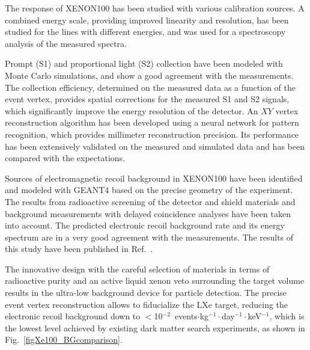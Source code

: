 The response of XENON100 has been studied with various calibration sources. A combined energy scale, providing improved linearity and resolution, has been studied for the lines with different energies, and was used for a spectroscopy analysis of the measured spectra.

Prompt (S1) and proportional light (S2) collection have been modeled with Monte Carlo simulations, and show a good agreement with the measurements. The collection efficiency, determined on the measured data as a function of the event vertex, provides spatial corrections for the measured S1 and S2 signals, which significantly improve the energy resolution of the detector. An $XY$ vertex reconstruction algorithm has been developed using a neural network for pattern recognition, which provides millimeter reconstruction precision. Its performance has been extensively validated on the measured and simulated data and has been compared with the expectations.

Sources of electromagnetic recoil background in XENON100 have been identified and modeled with GEANT4 based on the precise geometry of the experiment. The results from radioactive screening of the detector and shield materials and background measurements with delayed coincidence analyses have been taken into account. The predicted electronic recoil background rate and its energy spectrum are in a very good agreement with the measurements. The results of this study have been published in Ref.~\cite{EMBG}.

The innovative design with the careful selection of materials in terms of radioactive purity and an active liquid xenon veto surrounding the target volume results in the ultra-low background device for particle detection. The precise event vertex reconstruction allows to fiducialize the LXe target, reducing the electronic recoil background down to $<$10$^{-2}$~events$\cdot$kg$^{-1}\cdot$day$^{-1}\cdot$keV$^{-1}$, which is the lowest level achieved by existing dark matter search experiments, as shown in Fig.~\ref{figXe100_BGcomparison}.

